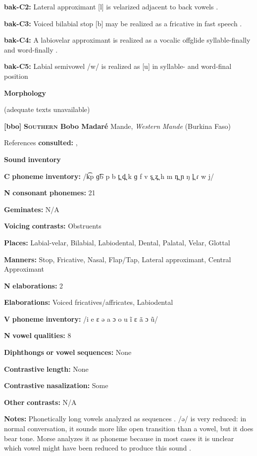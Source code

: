 \textbf{bak-C2:} Lateral approximant [l] is velarized adjacent to back vowels \citep[10]{Poppe1964}.

\textbf{bak-C3:} Voiced bilabial stop [b] may be realized as a fricative in fast speech \citep[8]{Poppe1964}.

\textbf{bak-C4:}  A labiovelar approximant is realized as a vocalic offglide syllable-finally and word-finally \citep[9]{Poppe1964}.

\textbf{bak-C5:} Labial semivowel /w/ is realized as [u] in syllable- and word-final position \citep[9]{Poppe1964}

\textbf{Morphology}

(adequate texts unavailable)

\textbf{[bbo]}   \textbf{\textsc{Southern} \textbf{Bobo} \textbf{Madaré}}  Mande, \textit{Western} \textit{Mande} (Burkina Faso)

References \textbf{consulted:} \citet{Morse1976}, \citet{Sanou1978}

\textbf{Sound} \textbf{inventory}

\textbf{C} \textbf{phoneme} \textbf{inventory:} /k͡p ɡ͡b p b t̪ d̪ k ɡ f v s̪ z̪ h m n̪ ɲ ŋ l̪ ɾ w j/

\textbf{N} \textbf{consonant} \textbf{phonemes:} 21

\textbf{Geminates:} N/A

\textbf{Voicing} \textbf{contrasts:} Obstruents

\textbf{Places:} Labial-velar, Bilabial, Labiodental, Dental, Palatal, Velar, Glottal

\textbf{Manners:} Stop, Fricative, Nasal, Flap/Tap, Lateral approximant, Central Approximant

\textbf{N} \textbf{elaborations:} 2

\textbf{Elaborations:} Voiced fricatives/affricates, Labiodental

\textbf{V} \textbf{phoneme} \textbf{inventory:} /i e ɛ ə a ɔ o u ĩ ɛ ã ɔ ũ/

\textbf{N} \textbf{vowel} \textbf{qualities:} 8

\textbf{Diphthongs} \textbf{or} \textbf{vowel} \textbf{sequences:} None

\textbf{Contrastive} \textbf{length:} None

\textbf{Contrastive} \textbf{nasalization:} Some

\textbf{Other} \textbf{contrasts:} N/A

\textbf{Notes:} Phonetically long vowels analyzed as sequences \citep[100-105]{Morse1976}. /ə/ is very reduced: in normal conversation, it sounds more like open transition than a vowel, but it does bear tone. Morse analyzes it as phoneme because in most cases it is unclear which vowel might have been reduced to produce this sound \citep[42-5]{Morse1976}.

